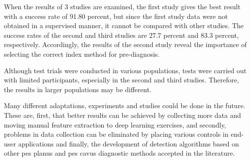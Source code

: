 When the results of 3 studies are examined, the first study gives the best result with a success rate of 91.80 percent, but since the first study data were not obtained in a supervised manner, it cannot be compared with other studies. The success rates of the second and third studies are 27.7 percent and 83.3 percent, respectively. Accordingly, the results of the second study reveal the importance of selecting the correct index method for pre-diagnosis.

Although test trials were conducted in various populations, tests were carried out with limited participants, especially in the second and third studies. Therefore, the results in larger populations may be different.

Many different adaptations, experiments and studies could be done in the future. These are, first, that better results can be achieved by collecting more data and moving manual feature extraction to deep learning exercises, and secondly, problems in data collection can be eliminated by placing various controls in end-user applications and finally, the development of detection algorithms based on other pes planus and pes cavus diagnostic methods accepted in the literature.